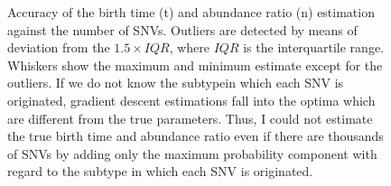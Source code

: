 \documentclass{article}
\begin{document}
\begin{figure}[H]
   \caption{
 Accuracy of the birth time (t) and abundance ratio (n) estimation against the number of SNVs. Outliers are detected by means of deviation from the $1.5 \times IQR$, where $IQR$ is the interquartile range. Whiskers show the maximum and minimum estimate except for the outliers. If we do not know the subtypein which each SNV is originated, gradient descent estimations fall into the optima which are different from the true parameters. Thus, I could not estimate the true birth time and abundance ratio even if there are thousands of SNVs by adding only the maximum probability component with regard to the subtype in which each SNV is originated.
  }
 \label{fig: binom_subtype_ungiven_mle}
\end{figure}
\end{document}
